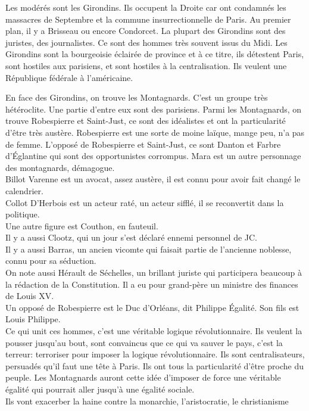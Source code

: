 \documentclass[10pt, a4paper, openany]{book}
\begin{document}
Les modérés sont les Girondins. Ils occupent la Droite car ont condamnés les massacres de Septembre et la commune insurrectionnelle de Paris. Au premier plan, il y a Brisseau ou encore Condorcet. La plupart des Girondins sont des juristes, des journalistes. Ce sont des hommes très souvent issus du Midi. Les Girondins sont la bourgeoisie éclairée de province et à ce titre, ils détestent Paris, sont hostiles aux parisiens, et sont hostiles à la centralisation. Ils veulent une République fédérale à l'américaine.


En face des Girondins, on trouve les Montagnards. C'est un groupe très hétéroclite. Une partie d'entre eux sont des parisiens. Parmi les Montagnards, on trouve Robespierre et Saint-Just, ce sont des idéalistes et ont la particularité d'être très austère. Robespierre est une sorte de moine laïque, mange peu, n'a pas de femme. L'opposé de Robespierre et Saint-Just, ce sont Danton et Farbre d'Églantine qui sont des opportunistes corrompus. Mara est un autre personnage des montagnards, démagogue. \\
Billot Varenne est un avocat, assez austère, il est connu pour avoir fait changé le calendrier. \\
Collot D'Herbois est un acteur raté, un acteur sifflé, il se reconvertit dans la politique. \\
Une autre figure est Couthon, en fauteuil. \\
Il y a aussi Clootz, qui un jour s'est déclaré ennemi personnel de JC. \\
Il y a aussi Barras, un ancien vicomte qui faisait partie de l'ancienne noblesse, connu pour sa séduction. \\
On note aussi Hérault de Séchelles, un brillant juriste qui participera beaucoup à la rédaction de la Constitution. Il a eu pour grand-père un ministre des finances de Louis XV. \\
Un opposé de Robespierre est le Duc d'Orléans, dit Philippe Égalité. Son fils est Louis Philippe. \\
Ce qui unit ces hommes, c'est une véritable logique révolutionnaire. Ils veulent la pousser jusqu'au bout, sont convaincus que ce qui va sauver le pays, c'est la terreur: terroriser pour imposer la logique révolutionnaire. Ils sont centralisateurs, persuadés qu'il faut une tête à Paris. Ils ont tous la particularité d'être proche du peuple. Les Montagnards auront cette idée d'imposer de force une véritable égalité qui pourrait aller jusqu'à une égalité sociale. \\
Ils vont exacerber la haine contre la monarchie, l'aristocratie, le christianisme 
\end{document}
